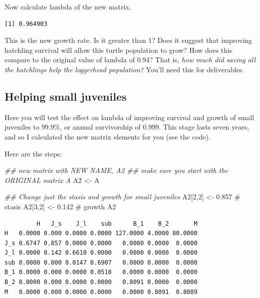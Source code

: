 \documentclass[
  letterpaper,
  DIV=11,
  numbers=noendperiod]{scrreprt}
\newenvironment{Shaded}{\begin{snugshade}}{\end{snugshade}}
\newcommand{\CommentTok}[1]{\textcolor[rgb]{0.37,0.37,0.37}{#1}}
\newcommand{\DecValTok}[1]{\textcolor[rgb]{0.68,0.00,0.00}{#1}}
\newcommand{\DocumentationTok}[1]{\textcolor[rgb]{0.37,0.37,0.37}{\textit{#1}}}
\newcommand{\FloatTok}[1]{\textcolor[rgb]{0.68,0.00,0.00}{#1}}
\newcommand{\FunctionTok}[1]{\textcolor[rgb]{0.28,0.35,0.67}{#1}}
\newcommand{\NormalTok}[1]{\textcolor[rgb]{0.00,0.23,0.31}{#1}}
\newcommand{\OtherTok}[1]{\textcolor[rgb]{0.00,0.23,0.31}{#1}}
\newcommand{\SpecialCharTok}[1]{\textcolor[rgb]{0.37,0.37,0.37}{#1}}
\begin{document}
Now calculate lambda of the new matrix.

\begin{Shaded}
\end{Shaded}

\begin{verbatim}
[1] 0.964903
\end{verbatim}

This is the new growth rate. Is it greater than 1? Does it suggest that
improving hatchling survival will allow this turtle population to grow?
How does this compare to the original value of lambda of 0.94? That is,
\emph{how much did saving all the hatchlings help the loggerhead
population?} You'll need this for deliverables.

\subsection{Helping small juveniles}\label{helping-small-juveniles}

Here you will test the effect on lambda of improving survival and growth
of small juveniles to 99.9\%, or annual survivorship of 0.999. This
stage lasts seven years, and so I calculated the new matrix elements for
you (see the code).

Here are the steps:

\begin{Shaded}
\begin{Highlighting}[]
\DocumentationTok{\#\# new matrix with NEW NAME, A2}
\DocumentationTok{\#\# make sure you start with the ORIGINAL matrix A }
\NormalTok{A2 }\OtherTok{\textless{}{-}}\NormalTok{ A}

\DocumentationTok{\#\# Change just the stasis and growth for small juveniles}
\NormalTok{A2[}\DecValTok{2}\NormalTok{,}\DecValTok{2}\NormalTok{] }\OtherTok{\textless{}{-}} \FloatTok{0.857} \CommentTok{\# stasis}
\NormalTok{A2[}\DecValTok{3}\NormalTok{,}\DecValTok{2}\NormalTok{] }\OtherTok{\textless{}{-}}  \FloatTok{0.142} \CommentTok{\# growth}
\NormalTok{A2}
\end{Highlighting}
\end{Shaded}

\begin{verbatim}
         H   J_s    J_l    sub      B_1    B_2       M
H   0.0000 0.000 0.0000 0.0000 127.0000 4.0000 80.0000
J_s 0.6747 0.857 0.0000 0.0000   0.0000 0.0000  0.0000
J_l 0.0000 0.142 0.6610 0.0000   0.0000 0.0000  0.0000
sub 0.0000 0.000 0.0147 0.6907   0.0000 0.0000  0.0000
B_1 0.0000 0.000 0.0000 0.0518   0.0000 0.0000  0.0000
B_2 0.0000 0.000 0.0000 0.0000   0.8091 0.0000  0.0000
M   0.0000 0.000 0.0000 0.0000   0.0000 0.8091  0.8089
\end{verbatim}
\end{document}
